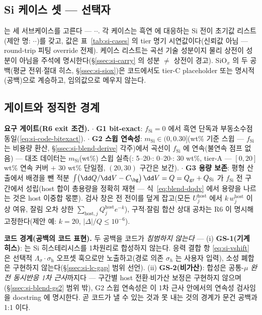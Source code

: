 \subsection{Si 케이스 셋 ---  선택자}\label{ssec:code-caseset}
 는 세 서브케이스를 고른다 --- $\cdot$$\cdot$.
각 케이스는 흑연  에 대응하는 Si 전이 초기값 리스트(제안 명:
$\cdot$$\cdot$)를 갖고, 값은 표~\ref{tab:si-cases}
의 tier 명기 시연값이다(신뢰값 아님 --- round-trip 피팅 override 전제). 케이스 리스트는 곡선 기술
성분이지 물리 상전이 성분이 아님을 주석에 명시한다(\S\ref{ssec:si-carry} 의 성분 $\ne$ 상전이 경고).
SiO$_x$ 의 두 공백(평균 전위$\cdot$절대 히스, \S\ref{ssec:si-siox})은 코드에서도 tier-C placeholder
또는 명시적 (공백)으로 계승하고, 임의값으로 메우지 않는다.

\subsection{게이트와 정직한 경계}\label{ssec:code-gates}
\begin{codebox}
\textbf{요구 게이트(R6 exit 조건).}
$\cdot$ \textbf{G1 bit-exact}: $f_\mathrm{Si}{=}0$ 에서 흑연 단독과 부동소수점 동일(\eqref{eq:si-code-bitexact}).
$\cdot$ \textbf{G2 스윕 연속성}: $m_\mathrm{Si}\in(0,0.30]$(wt\% 기준 스윕 --- $f_\mathrm{Si}$ 는 비용량 환산, \S\ref{ssec:si-blend-derive} 각주)에서 곡선이 $f_\mathrm{Si}$ 에 연속(불연속 점프 없음)
--- 대조 데이터는 $m_\mathrm{Si}$(wt\%) 스윕 실측(\cite{gautam_blend2024}: 5--20$\cdot$\cite{moyassari_blend2022}: 0--20$\cdot$\cite{chatzogiannakis_blend2025}: 30 wt\%, tier-A --- $[0,20]$ wt\% 연속 커버 $+$ 30 wt\% 단일점, $(20,30)$ 구간은 보간).
$\cdot$ \textbf{G3 용량 보존}: 평형 산출에서 배경을 뺀 적분
$\int\bigl(\dd Q/\dd V-C_\bg\bigr)\,\dd V=Q=Q_\mathrm{gr}+Q_\mathrm{Si}$ 가 $f_\mathrm{Si}$
전 구간에서 성립(host 합이 총용량을 정확히 재현 --- 식~\eqref{eq:blend-dqdv} 에서 용량을 나르는 것은
host 이중합 몫뿐). 검사 창은 전 전이를 덮게 잡고(모든 $U_j^\mathrm{host}$ 에서 $k\,w_j^\mathrm{host}$
이상 여유, 잘림 오차 상한 $\sum_{\mathrm{host},j}Q_j^\mathrm{host}e^{-k}$), 구적$\cdot$잘림 합산 상대
공차는 R6 이 명시해 고정한다(제안 예: $k{=}20$, $|\Delta|/Q\le10^{-6}$).
\end{codebox}

\begin{warnbox}
\textbf{코드 경계(공백의 코드 표현).} 두 공백을 코드가 \emph{침범하지 않는다} --- (i) \textbf{GS-1(기계
히스)}:  는 Si 히스테리시스를 1차원리로 합성하지 않는다. 응력 결합 항
\eqref{eq:si-vshift} 은 선택적 $\Lambda_\sigma\!\cdot\!\sigma_\mathrm{h}$ 오프셋 훅으로만 노출하고(경로 의존 $\sigma_h$
는 사용자 입력), 소성 폐합은 구현하지 않는다(\S\ref{ssec:si-lc-gap} 범위 선언). (ii) \textbf{GS-2(비가산)}:
합성은 공통-$\mu$ \emph{완전 동시반응 1차 근사}까지다 --- 구간별 host 전환$\cdot$비가산 보정은 구현하지
않으며(\S\ref{ssec:si-blend-gs2} 범위 밖), G2 스윕 연속성은 이 1차 근사 안에서의 연속성 검사임을 docstring
에 명시한다. 곧 코드가 낼 수 있는 것과 못 내는 것의 경계가 문건 공백과 1:1 이다.
\end{warnbox}

